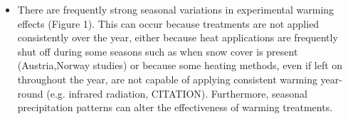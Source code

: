 \documentclass{article}
\begin{document}
\begin{itemize}
\item There are frequently strong seasonal variations in experimental warming effects (Figure 1). This can occur because treatments are not applied consistently over the year, either because heat applications are frequently shut off during some seasons such as when snow cover is present \citep[e.g.][]{clark2014a,clark2014b} (Austria,Norway studies) or because some heating methods, even if left on throughout the year, are not capable of applying consistent warming year-round (e.g. infrared radiation, CITATION). Furthermore, seasonal precipitation patterns can alter the effectiveness of warming treatments. %


\end{itemize}
\end{document}
